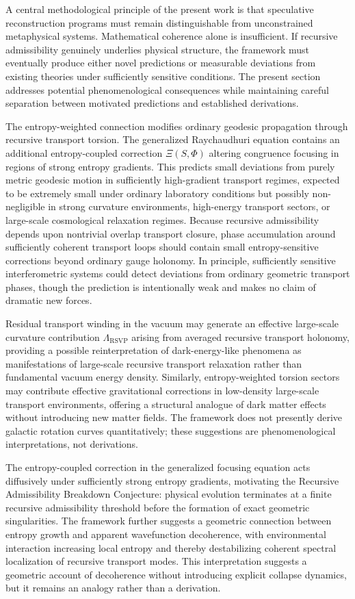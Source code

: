 \documentclass[12pt,a4paper]{article}
\newcommand{\RSVP}{\textrm{RSVP}}
\begin{document}
A central methodological principle of the present work is that speculative
reconstruction programs must remain distinguishable from unconstrained
metaphysical systems. Mathematical coherence alone is insufficient. If recursive
admissibility genuinely underlies physical structure, the framework must
eventually produce either novel predictions or measurable deviations from
existing theories under sufficiently sensitive conditions. The present section
addresses potential phenomenological consequences while maintaining careful
separation between motivated predictions and established derivations.

The entropy-weighted connection modifies ordinary geodesic propagation through
recursive transport torsion. The generalized Raychaudhuri equation contains an
additional entropy-coupled correction $\Xi(S,\Phi)$ altering congruence focusing
in regions of strong entropy gradients. This predicts small deviations from
purely metric geodesic motion in sufficiently high-gradient transport regimes,
expected to be extremely small under ordinary laboratory conditions but possibly
non-negligible in strong curvature environments, high-energy transport sectors,
or large-scale cosmological relaxation regimes. Because recursive admissibility
depends upon nontrivial overlap transport closure, phase accumulation around
sufficiently coherent transport loops should contain small entropy-sensitive
corrections beyond ordinary gauge holonomy. In principle, sufficiently sensitive
interferometric systems could detect deviations from ordinary geometric transport
phases, though the prediction is intentionally weak and makes no claim of
dramatic new forces.

Residual transport winding in the vacuum may generate an effective large-scale
curvature contribution $\Lambda_\RSVP$ arising from averaged recursive transport
holonomy, providing a possible reinterpretation of dark-energy-like phenomena
as manifestations of large-scale recursive transport relaxation rather than
fundamental vacuum energy density. Similarly, entropy-weighted torsion sectors
may contribute effective gravitational corrections in low-density large-scale
transport environments, offering a structural analogue of dark matter effects
without introducing new matter fields. The framework does not presently derive
galactic rotation curves quantitatively; these suggestions are phenomenological
interpretations, not derivations.

The entropy-coupled correction in the generalized focusing equation acts
diffusively under sufficiently strong entropy gradients, motivating the
Recursive Admissibility Breakdown Conjecture: physical evolution terminates at
a finite recursive admissibility threshold before the formation of exact
geometric singularities. The framework further suggests a geometric connection
between entropy growth and apparent wavefunction decoherence, with environmental
interaction increasing local entropy and thereby destabilizing coherent spectral
localization of recursive transport modes. This interpretation suggests a
geometric account of decoherence without introducing explicit collapse dynamics,
but it remains an analogy rather than a derivation.
\end{document}
